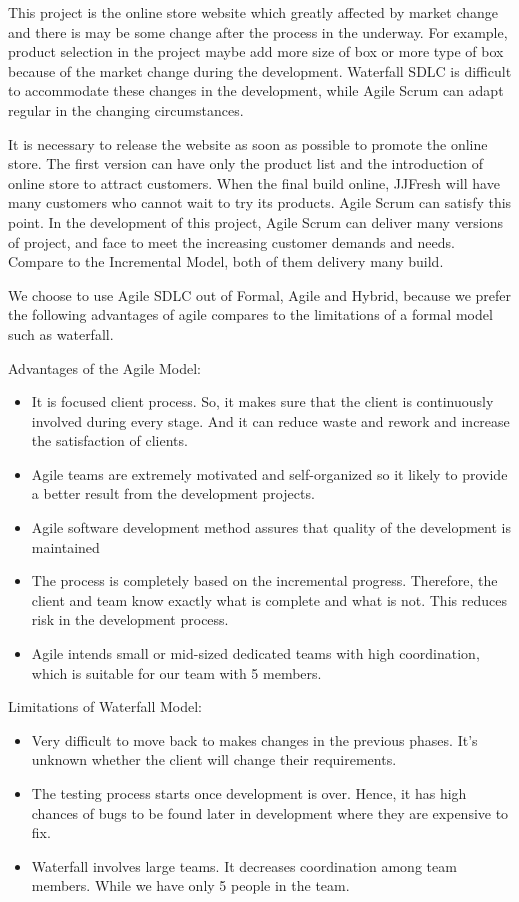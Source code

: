 \documentclass{report}
\begin{document}
This project is the online store website which greatly affected by market change and there is may be some change after the process in the underway. For example, product selection in the project maybe add more size of box or more type of box because of the market change during the development. Waterfall SDLC is difficult to accommodate these changes in the development, while Agile Scrum can adapt regular in the changing circumstances.

It is necessary to release the website as soon as possible to promote the online store. The first version can have only the product list and the introduction of online store to attract customers. When the final build online, JJFresh will have many customers who cannot wait to try its products. Agile Scrum can satisfy this point. In the development of this project, Agile Scrum can deliver many versions of project, and face to meet the increasing customer demands and needs. Compare to the Incremental Model, both of them delivery many build.

We choose to use Agile SDLC out of Formal, Agile and Hybrid, because we prefer the following advantages of agile compares to the limitations of a formal model such as waterfall.

Advantages of the Agile Model:
\begin{itemize}
  \item It is focused client process. So, it makes sure that the client is continuously involved during every stage. And it can reduce waste and rework and increase the satisfaction of clients.
  \item Agile teams are extremely motivated and self-organized so it likely to provide a better result from the development projects.
  \item Agile software development method assures that quality of the development is maintained
  \item The process is completely based on the incremental progress. Therefore, the client and team know exactly what is complete and what is not. This reduces risk in the development process.
  \item Agile intends small or mid-sized dedicated teams with high coordination, which is suitable for our team with 5 members.
\end{itemize}
Limitations of Waterfall Model:
\begin{itemize}
  \item Very difficult to move back to makes changes in the previous phases. It's unknown whether the client will change their requirements.
  \item The testing process starts once development is over. Hence, it has high chances of bugs to be found later in development where they are expensive to fix.
  \item Waterfall involves large teams. It decreases coordination among team members. While we have only 5 people in the team.
\end{itemize}
\end{document}
